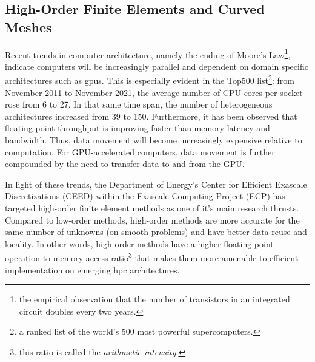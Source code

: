 \documentclass[../doc.tex]{subfiles}
\begin{document}
\subsection{High-Order Finite Elements and Curved Meshes}
Recent trends in computer architecture, namely the ending of Moore's Law\footnote{the empirical observation that the number of transistors in an integrated circuit doubles every two years.}, indicate computers will be increasingly parallel and dependent on domain specific architectures such as \glspl{gpu}. This is especially evident in the Top500 list\footnote{a ranked list of the world's 500 most powerful supercomputers.}: from November 2011 to November 2021, the average number of CPU cores per socket rose from 6 to 27. 
In that same time span, the number of heterogeneous architectures increased from 39 to 150. 
Furthermore, it has been observed that floating point throughput is improving faster than memory latency and bandwidth. Thus, data movement will become increasingly expensive relative to computation. For GPU-accelerated computers, data movement is further compounded by the need to transfer data to and from the GPU. 

In light of these trends, the Department of Energy's Center for Efficient Exascale Discretizations (CEED) within the Exascale Computing Project (ECP) has targeted high-order finite element methods as one of it's main research thrusts. Compared to low-order methods, high-order methods are more accurate for the same number of unknowns (on smooth problems) and have better data reuse and locality. In other words, high-order methods have a higher floating point operation to memory access ratio\footnote{this ratio is called the \emph{arithmetic intensity}.} that makes them more amenable to efficient implementation on emerging \gls{hpc} architectures. 
\end{document}
